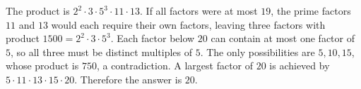 The product is $2^2\cdot3\cdot5^3\cdot11\cdot13$. If all factors were at most $19$, the prime factors $11$ and $13$ would each require their own factors, leaving three factors with product $1500=2^2\cdot3\cdot5^3$. Each factor below $20$ can contain at most one factor of $5$, so all three must be distinct multiples of $5$. The only possibilities are $5,10,15$, whose product is $750$, a contradiction. A largest factor of $20$ is achieved by $5\cdot11\cdot13\cdot15\cdot20$. Therefore the answer is $\boxed{20}$.
